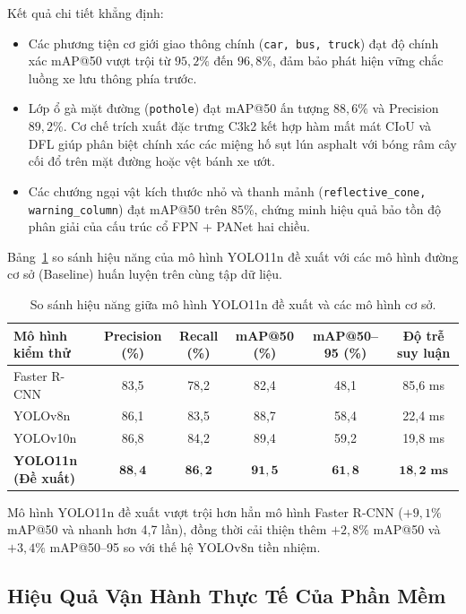 Kết quả chi tiết khẳng định:
\begin{itemize}
    \item Các phương tiện cơ giới giao thông chính (\texttt{car, bus, truck}) đạt độ chính xác mAP@50 vượt trội từ $95,2\%$ đến $96,8\%$, đảm bảo phát hiện vững chắc luồng xe lưu thông phía trước.
    \item Lớp ổ gà mặt đường (\texttt{pothole}) đạt mAP@50 ấn tượng $88,6\%$ và Precision $89,2\%$. Cơ chế trích xuất đặc trưng C3k2 kết hợp hàm mất mát CIoU và DFL giúp phân biệt chính xác các miệng hố sụt lún asphalt với bóng râm cây cối đổ trên mặt đường hoặc vệt bánh xe ướt.
    \item Các chướng ngại vật kích thước nhỏ và thanh mảnh (\texttt{reflective\_cone, warning\_column}) đạt mAP@50 trên $85\%$, chứng minh hiệu quả bảo tồn độ phân giải của cấu trúc cổ FPN + PANet hai chiều.
\end{itemize}

Bảng~\ref{tab:model_comparison} so sánh hiệu năng của mô hình YOLO11n đề xuất với các mô hình đường cơ sở (Baseline) huấn luyện trên cùng tập dữ liệu.

\begin{table}[htbp]
\centering
\caption{So sánh hiệu năng giữa mô hình YOLO11n đề xuất và các mô hình cơ sở.}
\label{tab:model_comparison}
\begin{tabular}{|l|c|c|c|c|c|}
\hline
\textbf{Mô hình kiểm thử} & \textbf{Precision (\%)} & \textbf{Recall (\%)} & \textbf{mAP@50 (\%)} & \textbf{mAP@50--95 (\%)} & \textbf{Độ trễ suy luận} \\ \hline
Faster R-CNN & 83,5 & 78,2 & 82,4 & 48,1 & 85,6 ms \\ \hline
YOLOv8n & 86,1 & 83,5 & 88,7 & 58,4 & 22,4 ms \\ \hline
YOLOv10n & 86,8 & 84,2 & 89,4 & 59,2 & 19,8 ms \\ \hline
\textbf{YOLO11n (Đề xuất)} & $\mathbf{88,4}$ & $\mathbf{86,2}$ & $\mathbf{91,5}$ & $\mathbf{61,8}$ & $\mathbf{18,2\text{ ms}}$ \\ \hline
\end{tabular}
\end{table}

Mô hình YOLO11n đề xuất vượt trội hơn hẳn mô hình Faster R-CNN ($+9,1\%$ mAP@50 và nhanh hơn 4,7 lần), đồng thời cải thiện thêm $+2,8\%$ mAP@50 và $+3,4\%$ mAP@50--95 so với thế hệ YOLOv8n tiền nhiệm.

\subsection{Hiệu Quả Vận Hành Thực Tế Của Phần Mềm}
\label{subsec:hieu_qua_phan_mem}

